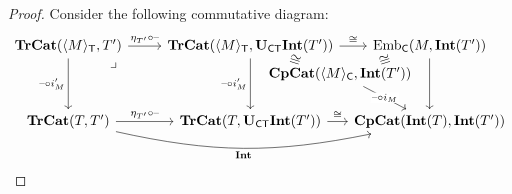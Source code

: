 \documentclass[11pt,oneside,article]{memoir}
\begin{document}
\begin{proof}
   Consider the following commutative diagram:
   \begin{equation*}
      \begin{tikzcd}[column sep=between origins,row sep=between origins]
         \TrCat(\Col{M}_{\MTCfont{T}},T')
               \ar[r,"\eta_{T'}\circ\textrm{--}"]
               \ar[dd,"\textrm{--}\circ i'_M"']
               \ar[ddr,phantom,"\lrcorner" very near start]
            &[2.4em,between borders] \TrCat(\Col{M}_{\MTCfont{T}},\UCT\Int(T'))
               \ar[dr,phantom,"\iso"' sloped]
               \ar[dd,"\textrm{--}\circ i'_M"']
               \ar[rr,"\iso"]
            &[6.4em]
            &[6.4em] \Emb_{\MTCfont{C}}(M,\Int(T')) \ar[dd] \\[2em]
         && \CompCat(\Col{M}_{\MTCfont{C}},\Int(T'))
               \ar[ur,phantom,"\iso" sloped]
               \ar[dr,"\textrm{--}\circ i_M" {description,inner sep=.2ex}] \\[3.4em]
         \TrCat(T,T')
               \ar[r,"\eta_{T'}\circ\textrm{--}"]
               \ar[rrr,bend right=12,"\Int"']
            & \TrCat(T,\UCT\Int(T'))
               \ar[rr,"\iso"]
            && \CompCat(\Int(T),\Int(T'))
      \end{tikzcd}
   \end{equation*}

\end{proof}
\end{document}
